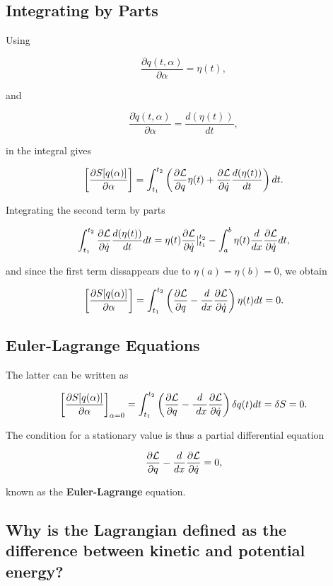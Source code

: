 \documentclass[%
oneside,                 %
final,                   %
10pt]{article}
\begin{document}
\subsection*{Integrating by Parts}

Using

\[
\frac{\partial q(t,\alpha)}{\partial \alpha}=\eta(t),
\]

and

\[
\frac{\partial \dot{q}(t,\alpha)}{\partial \alpha}=\frac{d(\eta(t))}{dt},
\]

in the integral gives

\[
\left[\frac{\partial  S[q(\alpha)]}{\partial \alpha}\right]=\int_{t_1}^{t_2} \left( \frac{\partial {\cal L}}{\partial q}\eta(t)+\frac{\partial {\cal L}}{\partial \dot{q}}\frac{d(\eta(t))}{dt}\right)dt.
\]

Integrating the second term by parts

\[
\int_{t_1}^{t_2} \frac{\partial {\cal L}}{\partial \dot{q}}\frac{d(\eta(t))}{dt}dt =\eta(t)\frac{\partial {\cal L}}{\partial \dot{q}}|_{t_1}^{t_2}-
\int_a^b \eta(t)\frac{d}{dx}\frac{\partial {\cal L}}{\partial \dot{q}}dt,
\]

and since the first term dissappears due to $\eta(a)=\eta(b)=0$, we obtain

\[
\left[\frac{\partial  S[q(\alpha)]}{\partial \alpha}\right]=\int_{t_1}^{t_2} \left( \frac{\partial {\cal L}}{\partial q}-\frac{d}{dx}\frac{\partial {\cal L}}{\partial \dot{q}}
\right)\eta(t)dt=0.
\]

\subsection*{Euler-Lagrange Equations}

The latter can be written as

\[
\left[\frac{\partial  S[q(\alpha)]}{\partial \alpha}\right]_{\alpha=0}=\int_{t_1}^{t_2} \left( \frac{\partial {\cal L}}{\partial q}-\frac{d}{\
dx}\frac{\partial {\cal L}}{\partial \dot{q}}\right)\delta q(t)dt=\delta S = 0.
\]

The condition for a stationary value is thus a partial differential equation

\[
\frac{\partial {\cal L}}{\partial q}-\frac{d}{dx}\frac{\partial {\cal L}}{\partial \dot{q}}=0,
\]

known as the \textbf{Euler-Lagrange} equation.

\subsection*{Why is the Lagrangian defined as the difference between kinetic and potential energy?}
\end{document}
